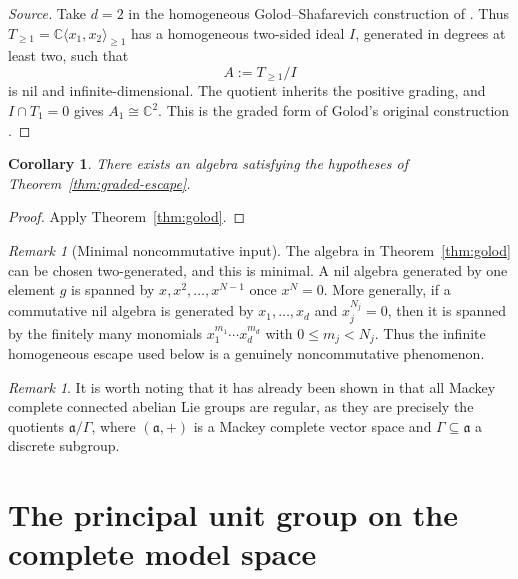 \documentclass[11pt]{article}
\newtheorem{corollary}[theorem]{Corollary}
\theoremstyle{remark}
\newtheorem{remark}[theorem]{Remark}
\begin{document}
\begin{proof}[Source]
Take $d=2$ in the homogeneous Golod--Shafarevich construction of
\cite[Theorem~1.1 and Section~4]{RegevRegev2009}.  Thus
$T_{\geq1}=\mathbb C\langle x_1,x_2\rangle_{\geq1}$ has a homogeneous
two-sided ideal $I$, generated in degrees at least two, such that
\[
  A:=T_{\geq1}/I
\]
is nil and infinite-dimensional.  The quotient inherits the positive grading,
and $I\cap T_1=0$ gives $A_1\cong\mathbb C^2$.  This is the graded form of
Golod's original construction \cite{Golod1964}.
\end{proof}

\begin{corollary}
\label{cor:existence}
There exists an algebra satisfying the hypotheses of
Theorem~\ref{thm:graded-escape}.
\end{corollary}

\begin{proof}
Apply Theorem~\ref{thm:golod}.
\end{proof}

\begin{remark}[Minimal noncommutative input]
\label{rem:noncommutative-input}
The algebra in Theorem~\ref{thm:golod} can be chosen two-generated, and this
is minimal.  A nil algebra generated by one element $g$ is spanned by
$x,x^2,\ldots,x^{N-1}$ once $x^N=0$.  More generally, if a commutative nil
algebra is generated by $x_1,\ldots,x_d$ and $x_j^{N_j}=0$, then it is spanned
by the finitely many monomials $x_1^{m_1}\cdots x_d^{m_d}$ with
$0\leq m_j<N_j$.  Thus the infinite homogeneous escape used below is a
genuinely noncommutative phenomenon.
\end{remark}

\begin{remark}
It is worth noting that it has already been shown in 
\cite[Theorem~6.3.3, p.~458]{GlocknerNeebBook2026}
that all Mackey complete connected abelian Lie groups are regular,
as they are precisely the quotients $\mathfrak{a}/\Gamma$,
where $(\mathfrak{a},+)$ is a Mackey complete vector space 
and $\Gamma \subseteq \mathfrak{a}$ a discrete subgroup.



\end{remark}







\section{The principal unit group on the complete model space}
\label{sec:cia}
\end{document}

